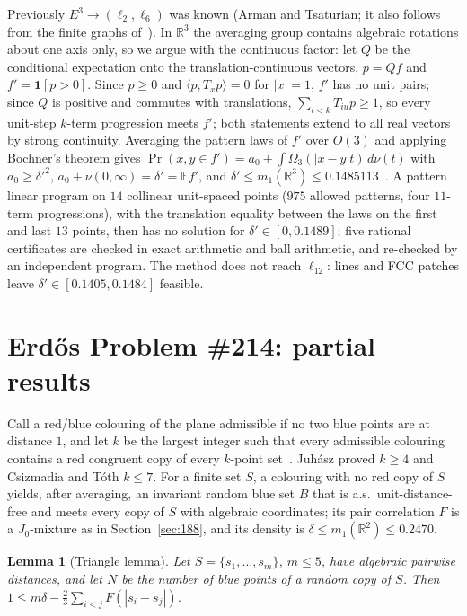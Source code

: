 \documentclass[11pt]{amsart}
\newtheorem{lemma}[theorem]{Lemma}
\theoremstyle{definition}
\newcommand{\R}{\mathbb{R}}
\newcommand{\E}{\mathbb{E}}
\begin{document}
Previously $E^3\to(\ell_2,\ell_6)$ was known (Arman and Tsaturian; it also follows from the finite graphs of~\cite{BassR3}). In $\R^3$ the averaging group contains algebraic rotations about one axis only, so we argue with the continuous factor: let $Q$ be the conditional expectation onto the translation-continuous vectors, $p=Qf$ and $f'=\mathbf 1[p>0]$. Since $p\ge0$ and $\langle p,T_xp\rangle=0$ for $|x|=1$, $f'$ has no unit pairs; since $Q$ is positive and commutes with translations, $\sum_{i<k}T_{iu}p\ge1$, so every unit-step $k$-term progression meets $f'$; both statements extend to all real vectors by strong continuity. Averaging the pattern laws of $f'$ over $O(3)$ and applying Bochner's theorem gives $\Pr(x,y\in f')=a_0+\int\Omega_3(|x-y|t)\,d\nu(t)$ with $a_0\ge\delta'^2$, $a_0+\nu(0,\infty)=\delta'=\E f'$, and $\delta'\le m_1(\R^3)\le0.1485113$~\cite{BassR3}. A pattern linear program on $14$ collinear unit-spaced points ($975$ allowed patterns, four $11$-term progressions), with the translation equality between the laws on the first and last $13$ points, then has no solution for $\delta'\in[0,0.1489]$; five rational certificates are checked in exact arithmetic and ball arithmetic, and re-checked by an independent program. The method does not reach $\ell_{12}$: lines and FCC patches leave $\delta'\in[0.1405,0.1484]$ feasible.

\section{Erd\H{o}s Problem \#214: partial results}\label{sec:214}

Call a red/blue colouring of the plane admissible if no two blue points are at distance $1$, and let $k$ be the largest integer such that every admissible colouring contains a red congruent copy of every $k$-point set~\cite[Problem \#214]{EP214}. Juh\'asz proved $k\ge4$ and Csizmadia and T\'oth $k\le7$. For a finite set $S$, a colouring with no red copy of $S$ yields, after averaging, an invariant random blue set $B$ that is a.s.\ unit-distance-free and meets every copy of $S$ with algebraic coordinates; its pair correlation $F$ is a $J_0$-mixture as in Section~\ref{sec:188}, and its density is $\delta\le m_1(\R^2)\le0.2470$.

\begin{lemma}[Triangle lemma]\label{lem:tri214}
Let $S=\{s_1,\dots,s_m\}$, $m\le5$, have algebraic pairwise distances, and let $N$ be the number of blue points of a random copy of $S$. Then $1\le m\delta-\frac23\sum_{i<j}F(|s_i-s_j|)$.
\end{lemma}
\end{document}

